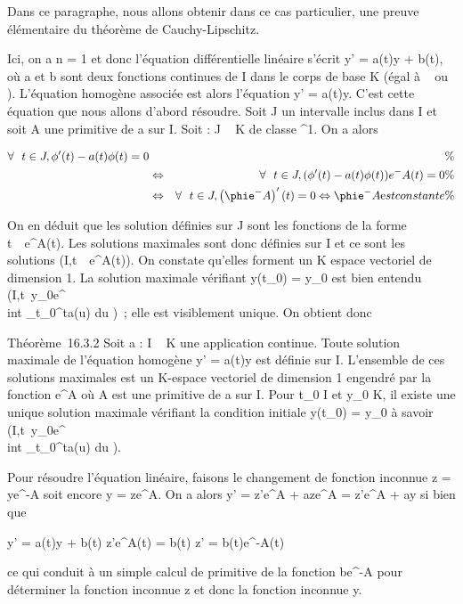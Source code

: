 \documentclass[]{article}
\begin{document}
Dans ce paragraphe, nous allons obtenir dans ce cas particulier, une
preuve élémentaire du théorème de Cauchy-Lipschitz.

Ici, on a n = 1 et donc l'équation différentielle linéaire s'écrit y' =
a(t)y + b(t), où a et b sont deux fonctions continues de I dans le corps
de base K (égal à ~ ou ). L'équation homogène associée est alors
l'équation y' = a(t)y. C'est cette équation que nous allons d'abord
résoudre. Soit J un intervalle inclus dans I et soit A une primitive de
a sur I. Soit \phi : J \rightarrow~ K de classe ^1. On a alors

\begin{align*} \forall~~t \in J,
\phi'(t) - a(t)\phi(t) = 0&& \%& \\ &
\Leftrightarrow & \forall~~t \in J, (\phi'(t)
- a(t)\phi(t))e^-A(t) = 0 \%& \\
& \Leftrightarrow & \forall~~t \in J,
\left (\phie^-A\right )'(t) = 0
\Leftrightarrow \phie^-A\text est
constante\%& \\
\end{align*}

On en déduit que les solution définies sur J sont les fonctions de la
forme t\mapsto~\lambda~e^A(t). Les solutions
maximales sont donc définies sur I et ce sont les solutions
(I,t\mapsto~\lambda~e^A(t)). On constate
qu'elles forment un K espace vectoriel de dimension 1. La solution
maximale vérifiant y(t\_0) = y\_0 est bien entendu
(I,t\mapsto~y\_0e^\\int
 \_t\_0^ta(u) du )~; elle est visiblement
unique. On obtient donc

Théorème~16.3.2 Soit a : I \rightarrow~ K une application continue. Toute solution
maximale de l'équation homogène y' = a(t)y est définie sur I. L'ensemble
de ces solutions maximales est un K-espace vectoriel de dimension 1
engendré par la fonction e^A où A est une primitive de a sur
I. Pour t\_0 \in I et y\_0 \in K, il existe une unique
solution maximale vérifiant la condition initiale y(t\_0) =
y\_0 à savoir
(I,t\mapsto~y\_0e^\\int
 \_t\_0^ta(u) du ).

Pour résoudre l'équation linéaire, faisons le changement de fonction
inconnue z = ye^-A soit encore y = ze^A. On a
alors y' = z'e^A + aze^A = z'e^A + ay
si bien que

y' = a(t)y + b(t) \Leftrightarrow z'e^A(t) =
b(t) \Leftrightarrow z' = b(t)e^-A(t)

ce qui conduit à un simple calcul de primitive de la fonction
be^-A pour déterminer la fonction inconnue z et donc la
fonction inconnue y.
\end{document}

